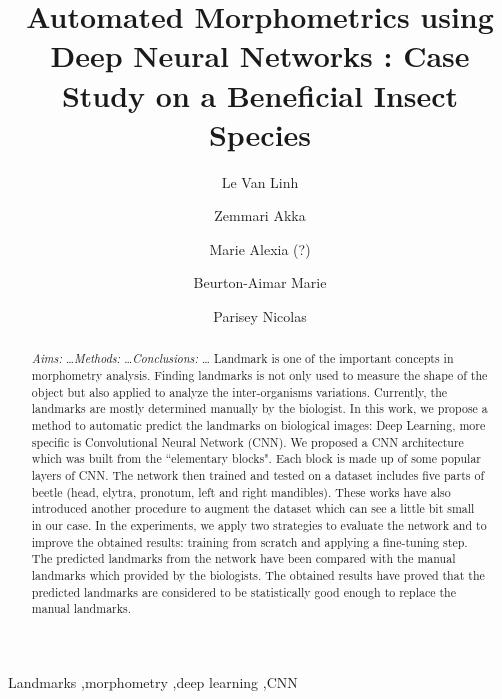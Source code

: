 \documentclass[review]{elsarticle}
\begin{document}
\begin{frontmatter}

  \title{Automated Morphometrics using Deep Neural Networks : Case Study on a Beneficial Insect Species}




\author[labri,itdlu]{Le Van Linh}
\author[labri]{Zemmari Akka}
\author[igepp]{Marie Alexia (?)}
\author[labri]{Beurton-Aimar Marie}
\author[igepp]{Parisey Nicolas}


\address[igepp]{UMR 1349 IGEPP, BP 35327, 35653 Le Rheu, France}

\address[labri]{University of Bordeaux, 351, cours de la Libération, 33405 Talence}
\address[itdlu]{Dalat University, Dalat, Lamdong, Vietnam}


\begin{abstract}
\textit{Aims:} \ldots \textit{Methods:} \ldots \textit{Conclusions:} \ldots
Landmark is one of the important concepts in morphometry analysis. Finding landmarks is not only used to measure the shape of the object but also applied to analyze the inter-organisms variations. Currently, the landmarks are mostly determined manually by the biologist.
In this work, we propose a method to automatic predict the landmarks on biological images: Deep Learning, more specific is Convolutional Neural Network (CNN). We proposed a CNN architecture which was built from the ``elementary blocks". Each block is made up of some popular layers of CNN.
The network then trained and tested on a dataset includes five parts of beetle (head, elytra, pronotum, left and right mandibles).
These works have also introduced another procedure to augment the dataset which can see a little bit small in our case.
In the experiments, we apply two strategies to evaluate the network and to improve the obtained results: training from scratch and applying a fine-tuning step.
The predicted landmarks from the network have been compared with the manual landmarks which provided by the biologists. The obtained results have proved that the predicted landmarks are considered to be statistically good enough to replace the manual landmarks.
\end{abstract}

\begin{keyword}
Landmarks \sep morphometry \sep deep learning \sep CNN
\end{keyword}

\end{frontmatter}
\end{document}
